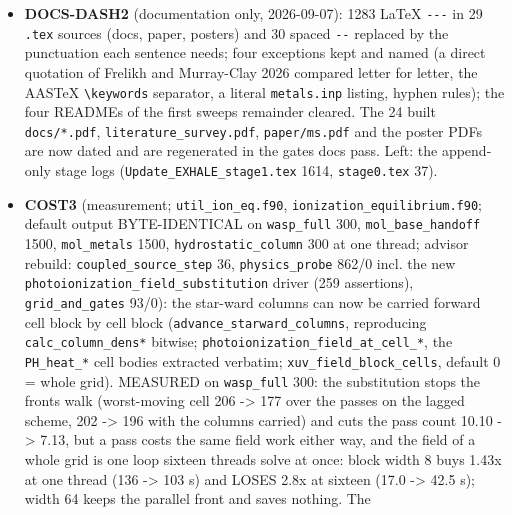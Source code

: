 \documentclass[english,a4paper]{my_memo}
\begin{document}
\begin{itemize}
  (DOCS-DASH2, launched: the \texttt{.md}/\texttt{.tex} twins realign there; the built
  PDFs are regenerated at the gate\textquotesingle s docs pass), plus
  \texttt{docs/lower\_atmosphere\_figs/README.md} (11) and three READMEs under
  \texttt{backup/} (5) outside the first sweep\textquotesingle s paths.
\item
  \textbf{DOCS-DASH2} (documentation only, 2026-09-07): 1283 LaTeX \texttt{-\/-\/-} in 29
  \texttt{.tex} sources (docs, paper, posters) and 30 spaced \texttt{-\/-} replaced by the
  punctuation each sentence needs; four exceptions kept and named (a direct
  quotation of Frelikh and Murray-Clay 2026 compared letter for letter, the
  AASTeX \texttt{\textbackslash{}keywords} separator, a literal \texttt{metals.inp} listing, hyphen rules);
  the four READMEs of the first sweep\textquotesingle s remainder cleared. The 24 built
  \texttt{docs/*.pdf}, \texttt{literature\_survey.pdf}, \texttt{paper/ms.pdf} and the poster PDFs
  are now dated and are regenerated in the gate\textquotesingle s docs pass. Left: the
  append-only stage logs (\texttt{Update\_EXHALE\_stage1.tex} 1614, \texttt{stage0.tex} 37).
\item
  \textbf{COST3} (measurement; \texttt{util\_ion\_eq.f90}, \texttt{ionization\_equilibrium.f90};
  default output BYTE-IDENTICAL on \texttt{wasp\_full} 300, \texttt{mol\_base\_handoff} 1500,
  \texttt{mol\_metals} 1500, \texttt{hydrostatic\_column} 300 at one thread; advisor rebuild:
  \texttt{coupled\_source\_step} 36, \texttt{physics\_probe} 862/0 incl. the new
  \texttt{photoionization\_field\_substitution} driver (259 assertions),
  \texttt{grid\_and\_gates} 93/0): the star-ward columns can now be carried forward
  cell block by cell block (\texttt{advance\_starward\_columns}, reproducing
  \texttt{calc\_column\_dens*} bitwise; \texttt{photoionization\_field\_at\_cell\_*}, the
  \texttt{PH\_heat\_*} cell bodies extracted verbatim; \texttt{xuv\_field\_block\_cells},
  default 0 = whole grid). MEASURED on \texttt{wasp\_full} 300: the substitution
  stops the front\textquotesingle s walk (worst-moving cell 206 -\textgreater{} 177 over the passes on
  the lagged scheme, 202 -\textgreater{} 196 with the columns carried) and cuts the pass
  count 10.10 -\textgreater{} 7.13, but a pass costs the same field work either way, and
  the field of a whole grid is one loop sixteen threads solve at once: block
  width 8 buys 1.43x at one thread (136 -\textgreater{} 103 s) and LOSES 2.8x at sixteen
  (17.0 -\textgreater{} 42.5 s); width 64 keeps the parallel front and saves nothing. The

\end{itemize}
\end{document}
